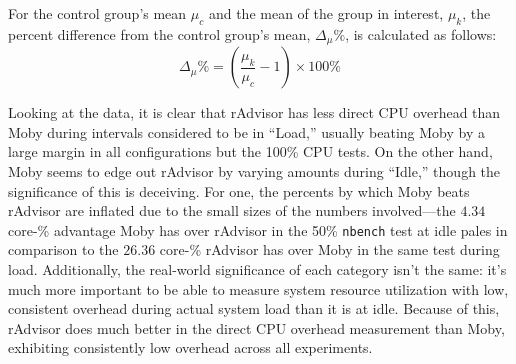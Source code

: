 \documentclass[a4paper,11pt]{article}
\begin{document}
For the control group's mean $\mu_c$ and the mean of the group in interest, $\mu_k$,
the percent difference from the control group's mean, $\Delta_\mu\%$, is calculated as follows:
\vspace{0.3em}
\begin{equation}
    \label{eq:1}
    \Delta_\mu\% = \left(\frac{\mu_k}{\mu_c}-1\right)\times100\%
\end{equation}
\vspace{-1.25em}

Looking at the data, it is clear that rAdvisor has less direct CPU overhead than Moby
during intervals considered to be in ``Load,''
usually beating Moby by a large margin in all configurations but the 100\% CPU tests.
On the other hand, Moby seems to edge out rAdvisor by varying amounts during ``Idle,''
though the significance of this is deceiving.
For one, the percents by which Moby beats rAdvisor are inflated due to the
small sizes of the numbers involved---the $4.34$ core-\% advantage Moby has over rAdvisor
in the 50\% \texttt{nbench} test at idle pales in comparison to the
$26.36$ core-\% rAdvisor has over Moby in the same test during load.
Additionally, the real-world significance of each category isn't the same:
it's much more important to be able to measure system resource utilization
with low, consistent overhead during actual system load than it is at idle.
Because of this, rAdvisor does much better in the direct CPU overhead measurement
than Moby, exhibiting consistently low overhead across all experiments. 

\newcommand{\fplus}[1][black]{\tikz\draw[#1,line width=0.1em] (0,0) -- (0.2,0)(0.1,0.1) -- (0.1,-0.1);}
\newcommand{\fminus}[1][black]{\raisebox{0.25em}{\tikz\draw[#1,line width=0.1em] (0,-0.1) -- (0.2,-0.1);}}
\end{document}
